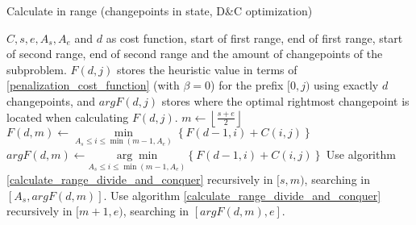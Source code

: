 \documentclass[pdflatex,sn-mathphys]{sn-jnl}%
\theoremstyle{thmstyleone}%
\theoremstyle{thmstyletwo}%
\theoremstyle{thmstylethree}%
\begin{document}
\begin{algorithm}[H]
\caption{Calculate in range (changepoints in state, D\&C optimization) }\label{calculate_range_divide_and_conquer}
\begin{algorithmic}[1]
\Require $C, s, e, A_s, A_e$ and $d$ as cost function, start of first range, end of first range, start of second range, end of second range and the amount of changepoints of the subproblem.
\Ensure $F(d,j)$ stores the heuristic value in terms of \ref{penalization_cost_function} (with $\beta = 0$) for the prefix $[0,j)$ using exactly $d$ changepoints, and $argF(d,j)$ stores where the optimal rightmost changepoint is located when calculating $F(d,j)$. 
\State $m \leftarrow \left \lfloor \frac{s+e}{2} \right \rfloor$
\State $F(d,m)\leftarrow \underset{A_s \leq i \leq \min(m-1, A_e)}{\min} \left \{F(d-1,i) + C(i,j) \right \}$
\State $argF(d,m) \leftarrow \underset{A_s \leq i \leq \min(m-1, A_e)}{\arg \min} \left \{F(d-1,i) + C(i,j) \right \}$
    \State Use algorithm \ref{calculate_range_divide_and_conquer} recursively in $[s, m)$, searching in $[A_s, argF(d,m)]$.
\EndIf
{}
    \State Use algorithm \ref{calculate_range_divide_and_conquer} recursively in $[m+1, e)$, searching in $[argF(d,m), e]$.
\EndIf

\end{algorithmic}
\end{algorithm}
\end{document}
